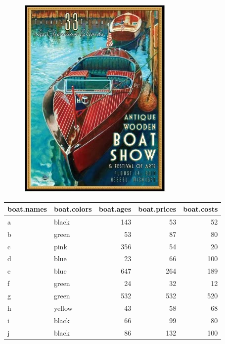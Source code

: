\documentclass[]{book}
\theoremstyle{definition}
\theoremstyle{definition}
\theoremstyle{remark}
\begin{document}
\begin{figure}

{\centering \includegraphics[width=0.5\linewidth]{images/antiqueboat} 

}

\end{figure}

\begin{tabular}{l|l|r|r|r}
\hline
boat.names & boat.colors & boat.ages & boat.prices & boat.costs\\
\hline
a & black & 143 & 53 & 52\\
\hline
b & green & 53 & 87 & 80\\
\hline
c & pink & 356 & 54 & 20\\
\hline
d & blue & 23 & 66 & 100\\
\hline
e & blue & 647 & 264 & 189\\
\hline
f & green & 24 & 32 & 12\\
\hline
g & green & 532 & 532 & 520\\
\hline
h & yellow & 43 & 58 & 68\\
\hline
i & black & 66 & 99 & 80\\
\hline
j & black & 86 & 132 & 100\\
\hline
\end{tabular}
\end{document}
